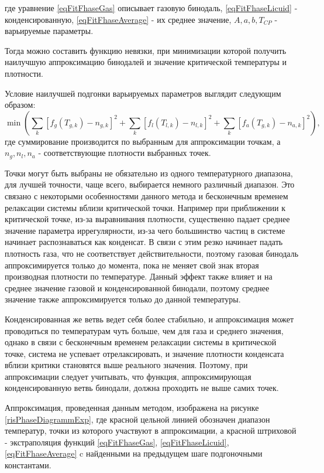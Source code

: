 где уравнение \ref{eqFitFhaseGas} описывает газовую бинодаль, \ref{eqFitFhaseLicuid} - конденсированную, \ref{eqFitFhaseAverage} - их среднее значение, $A, a, b, T_{CP}$ - варьируемые параметры. 

Тогда можно составить функцию невязки, при минимизации которой получить наилучшую аппроксимацию бинодалей и значение критической температуры и плотности.

Условие наилучшей подгонки варьируемых параметров выглядит следующим образом:
\begin{equation}
\min \left(\sum\limits_{k} \left[ f_g(T_{g, k}) - n_{g, k}  \right]^2 + \sum\limits_{k} \left[ f_l(T_{l, k}) - n_{l, k}  \right]^2 + \sum\limits_{k} \left[ f_a(T_{g, k}) - n_{a, k}  \right]^2 \right),
\label{eqFitResidual}
\end{equation}
где суммирование производится по выбранным для аппроксимации точкам, а $n_g, n_l, n_a$ - соответствующие плотности выбранных точек. 

Точки могут быть выбраны не обязательно из одного температурного диапазона, для лучшей точности, чаще всего, выбирается немного различный диапазон. Это связано с некоторыми особенностями данного метода и бесконечным временем релаксации системы вблизи критической точки. Например при приближении к критической точке, из-за выравнивания плотности, существенно падает среднее значение параметра иррегулярности, из-за чего большинство частиц в системе начинает распознаваться как конденсат. В связи с этим резко начинает падать плотность газа, что не соответствует действительности, поэтому газовая бинодаль аппроксимируется только до момента, пока не меняет свой знак вторая производная плотности по температуре. Данный эффект также влияет и на среднее значение газовой и конденсированной бинодали, поэтому среднее значение также аппроксимируется только до данной температуры.

Конденсированная же ветвь ведет себя более стабильно, и аппроксимация может проводиться по температурам чуть больше, чем для газа и среднего значения, однако в связи с бесконечным временем релаксации системы в критической точке, система не успевает отрелаксировать, и значение плотности конденсата вблизи критики становятся выше реального значения. Поэтому, при аппроксимации следует учитывать, что функция, аппроксимирующая конденсированную ветвь бинодали, должна проходить не выше самих точек.

Аппроксимация, проведенная данным методом, изображена на рисунке \ref{risPhaseDiagrammExp}, где красной цельной линией обозначен диапазон температур, точки из которого участвуют в аппроксимации, а красной штриховой - экстраполяция функций \ref{eqFitFhaseGas}, \ref{eqFitFhaseLicuid}, \ref{eqFitFhaseAverage} c найденными на предыдущем шаге подгоночными константами.

